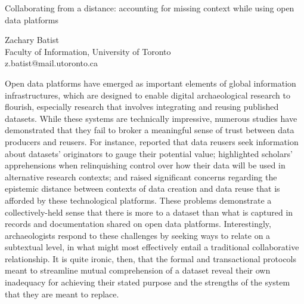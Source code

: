 \documentclass[a4paper]{article}
\begin{document}

\large
\begin{center}
Collaborating from a distance: accounting for missing context while using open data platforms

\large
Zachary Batist\\

\small  
Faculty of Information, University of Toronto\\
z.batist@mail.utoronto.ca\\

\end{center}

\normalsize

Open data platforms have emerged as important elements of global information infrastructures, which are designed to enable digital archaeological research to flourish, especially research that involves integrating and reusing published datasets. While these systems are technically impressive, numerous studies have demonstrated that they fail to broker a meaningful sense of trust between data producers and reusers. For instance, \cite{faniel2013} reported that data reusers seek information about datasets' originators to gauge their potential value; \cite{opitz2021} highlighted scholars' apprehensions when relinquishing control over how their data will be used in alternative research contexts; and \cite{huggett2022} raised significant concerns regarding the epistemic distance between contexts of data creation and data reuse that is afforded by these technological platforms. These problems demonstrate a collectively-held sense that there is more to a dataset than what is captured in records and documentation shared on open data platforms. Interestingly, archaeologists respond to these challenges by seeking ways to relate on a subtextual level, in what might most effectively entail a traditional collaborative relationship. It is quite ironic, then, that the formal and transactional protocols meant to streamline mutual comprehension of a dataset reveal their own inadequacy for achieving their stated purpose and the strengths of the system that they are meant to replace.
\end{document}
